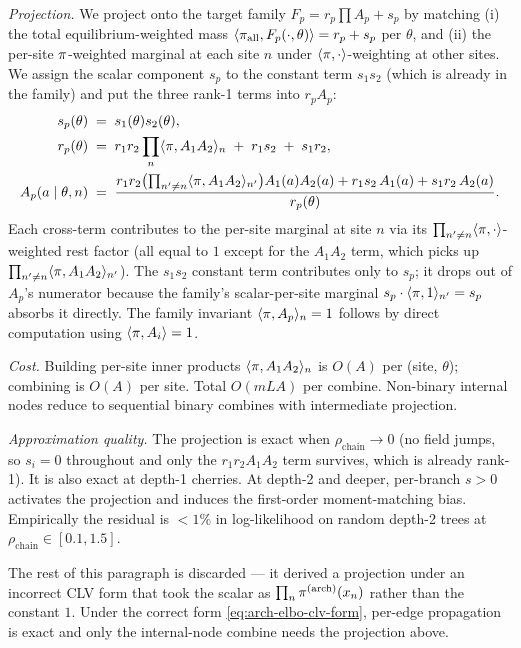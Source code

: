 \emph{Projection.} We project onto the target family
$F_p = r_p \prod A_p + s_p$ by matching (i) the total
equilibrium-weighted mass $\langle \pi_{\text{all}}, F_p(\cdot,
\theta) \rangle = r_p + s_p$ per $\theta$, and (ii) the per-site
$\pi$-weighted marginal at each site $n$ under $\langle \pi,
\cdot \rangle$-weighting at other sites. We assign the scalar
component $s_p$ to the constant term $s_1 s_2$ (which is already in
the family) and put the three rank-1 terms into $r_p A_p$:
\begin{align}
s_p(\theta) &\;=\; s_1(\theta) s_2(\theta), \\
r_p(\theta) &\;=\; r_1 r_2 \prod_n \langle \pi, A_1 A_2 \rangle_n
    \;+\; r_1 s_2 \;+\; s_1 r_2, \\
A_p(a \mid \theta, n)
    &\;=\; \frac{r_1 r_2 \bigl(\prod_{n' \ne n} \langle \pi, A_1 A_2 \rangle_{n'}\bigr) A_1(a) A_2(a)
                     + r_1 s_2\, A_1(a) + s_1 r_2\, A_2(a)}
                    {r_p(\theta)}.
\end{align}
Each cross-term contributes to the per-site marginal at site $n$
via its $\prod_{n' \ne n} \langle \pi, \cdot \rangle$-weighted rest
factor (all equal to $1$ except for the $A_1 A_2$ term, which picks up
$\prod_{n' \ne n} \langle \pi, A_1 A_2 \rangle_{n'}$). The
$s_1 s_2$ constant term contributes only to $s_p$; it drops out of
$A_p$'s numerator because the family's scalar-per-site marginal $s_p
\cdot \langle \pi, 1 \rangle_{n'} = s_p$ absorbs it directly. The
family invariant $\langle \pi, A_p \rangle_n = 1$ follows by direct
computation using $\langle \pi, A_i \rangle = 1$.

\emph{Cost.} Building per-site inner products $\langle \pi,
A_1 A_2 \rangle_n$ is $O(A)$ per (site, $\theta$); combining is $O(A)$
per site. Total $O(m L A)$ per combine. Non-binary internal nodes
reduce to sequential binary combines with intermediate projection.

\emph{Approximation quality.} The projection is exact when
$\rho_{\text{chain}} \to 0$ (no field jumps, so $s_i = 0$ throughout
and only the $r_1 r_2 A_1 A_2$ term survives, which is already
rank-1). It is also exact at depth-1 cherries. At depth-2 and deeper,
per-branch $s > 0$ activates the projection and induces the
first-order moment-matching bias. Empirically the residual is
$< 1\%$ in log-likelihood on random depth-2 trees at
$\rho_{\text{chain}} \in [0.1, 1.5]$.

The rest of this paragraph is discarded --- it derived a projection
under an incorrect CLV form that took the scalar as
$\prod_n \pi^{(\mathrm{arch})}(x_n)$ rather than the constant $1$.
Under the correct form \eqref{eq:arch-elbo-clv-form}, per-edge
propagation is exact and only the internal-node combine needs the
projection above.

